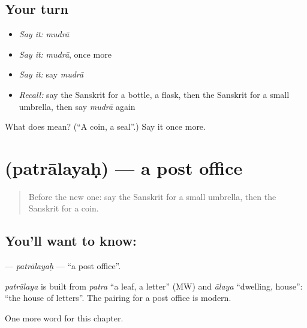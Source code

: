 \subsection*{Your turn}
\begin{itemize}
\raggedright
  \item \emph{Say it:} \emph{mudrā}
  \item \emph{Say it:} \emph{mudrā}, once more
  \item \emph{Say it:} say \emph{mudrā}
  \item \emph{Recall:} say the Sanskrit for a bottle, a flask, then the Sanskrit for a small umbrella, then say \emph{mudrā} again
\end{itemize}

\begin{tcolorbox}[breakable,colback=teal!4,colframe=teal!35!black,title={Before you move on}]
What does  mean? (\textquotedblleft{}A coin, a seal\textquotedblright{}.) Say it once more.
\end{tcolorbox}
\section[\texorpdfstring{\sk{पत्रालयः} (patrālayaḥ)}{पत्रालयः (patrālayaḥ)}]{ (patrālayaḥ) — a post office}

\label{lesson:SA-C120-patralayah}



\begin{quote}
Before the new one: say the Sanskrit for a small umbrella, then the Sanskrit for a coin.
\end{quote}

\subsection*{You'll want to know: }
\textbf{} — \emph{patrālayaḥ} — \textquotedblleft{}a post office\textquotedblright{}.

\begin{cousinweb}
\emph{patrālaya} is built from \emph{patra} \textquotedblleft{}a leaf, a letter\textquotedblright{} (MW) and \emph{ālaya} \textquotedblleft{}dwelling, house\textquotedblright{}: \textquotedblleft{}the house of letters\textquotedblright{}. The pairing for a post office is modern.
\end{cousinweb}

\begin{grammarlens}[title={What you've built}]
One more word for this chapter.
\end{grammarlens}

